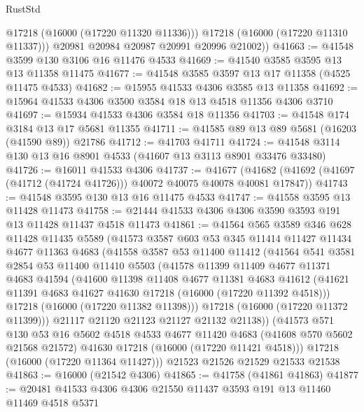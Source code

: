 \begin{lexlean}{RustStd}
\begin{coremodule}
            @17218
            (@16000 (@17220 @11320 @11336)))
          @17218
          (@16000 (@17220 @11310 @11337)))
        @20981
        @20984
        @20987
        @20991
        @20996
        @21002))
@41663 := @41548 @3599 @130 @3106 @16 @11476 @4533
@41669 := @41540 @3585 @3595 @13 @13 @11358 @11475
@41677 := @41548 @3585 @3597 @13 @17 @11358 (@4525 @11475 @4533)
@41682 := @15955 @41533 @4306 @3585 @13 @11358
@41692 := @15964 @41533 @4306 @3500 @3584 @18 @13 @4518 @11356 @4306 @3710
@41697 := @15934 @41533 @4306 @3584 @18 @11356
@41703 := @41548 @174 @3184 @13 @17 @5681 @11355
@41711 := @41585 @89 @13 @89 @5681 (@16203 (@41590 @89)) @21786
@41712 := @41703 @41711
@41724 := @41548 @3114 @130 @13 @16 @8901 @4533 (@41607 @13 @3113 @8901 @33476 @33480)
@41726 := @16011 @41533 @4306
@41737 := @41677
    (@41682 (@41692 (@41697 (@41712 (@41724 @41726))) @40072 @40075 @40078 @40081 @17847))
@41743 := @41548 @3595 @130 @13 @16 @11475 @4533
@41747 := @41558 @3595 @13 @11428 @11473
@41758 := @21444 @41533 @4306 @4306 @3590 @3593 @191 @13 @11428 @11437 @4518 @11473
@41861 := @41564
    @565
    @3589
    @346
    @628
    @11428
    @11435
    @5589
    (@41573
      @3587
      @603
      @53
      @345
      @11414
      @11427
      @11434
      @4677
      @11363
      @4683
      (@41558
        @3587
        @53
        @11400
        @11412
        (@41564
          @541
          @3581
          @2854
          @53
          @11400
          @11410
          @5503
          (@41578
            @11399
            @11409
            @4677
            @11371
            @4683
            @41594
            (@41600
              @11398
              @11408
              @4677
              @11381
              @4683
              @41612
              (@41621 @11391 @4683 @41627 @41630 @17218 (@16000 (@17220 @11392 @4518)))
              @17218
              (@16000 (@17220 @11382 @11398)))
            @17218
            (@16000 (@17220 @11372 @11399)))
          @21117
          @21120
          @21123
          @21127
          @21132
          @21138))
      (@41573
        @571
        @130
        @53
        @16
        @5602
        @4518
        @4533
        @4677
        @11420
        @4683
        (@41608 @570 @5602 @21568 @21572)
        @41630
        @17218
        (@16000 (@17220 @11421 @4518)))
      @17218
      (@16000 (@17220 @11364 @11427)))
    @21523
    @21526
    @21529
    @21533
    @21538
@41863 := @16000 (@21542 @4306)
@41865 := @41758 (@41861 @41863)
@41877 := @20481 @41533 @4306 @4306 @21550 @11437 @3593 @191 @13 @11460 @11469 @4518 @5371

\end{coremodule}
\end{lexlean}
